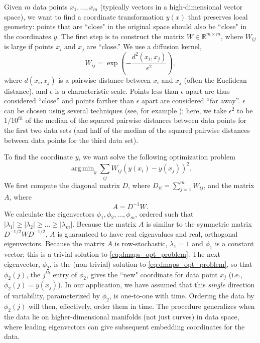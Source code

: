 \documentclass{pnastwo}
\DeclareMathOperator*{\argmin}{arg\,min}
\begin{document}
\begin{article}
Given $m$ data points $x_1, \dots, x_m$ (typically vectors in a high-dimensional vector space), we want to find a coordinate transformation $y(x)$ that preserves local geometry: points that are ``close" in the original space should also be ``close" in the coordinates $y$.
%
The first step is to construct the matrix $W \in \mathbb{R}^{m \times m}$, where $W_{ij}$ is large if points $x_i$ and $x_j$ are ``close.''
%
We use a diffusion kernel,
\begin{equation} \label{eq:dmaps_W}
W_{ij} = \exp \left( -\frac{d^2(x_i, x_j)}{\epsilon^2} \right),
\end{equation}
where $d(x_i, x_j)$ is a pairwise distance between $x_i$ and $x_j$ (often the Euclidean distance), and $\epsilon$ is a characteristic scale.
%
Points less than $\epsilon$ apart are thus considered ``close'' and points farther than $\epsilon$ apart are considered ``far away''.
%
$\epsilon$ can be chosen using several techniques (see, for example \cite{coifman2008graph, rohrdanz2011determination}); here, we take $\epsilon^2$ to be $1/10^{th}$ of the median of the squared pairwise distances between data points for the first two data sets (and half of the median of the squared pairwise distances between data points for the third data set).

To find the coordinate $y$, we want solve the following optimization problem \cite{Belkin2003}
\begin{equation} \label{eq:dmaps_opt_problem}
\argmin_{y} \sum_{ij} W_{ij} (y(x_i) - y(x_j))^2.
\end{equation}
%
We first compute the diagonal matrix $D$, where $D_{ii} = \sum_{j=1}^{m} W_{ij}$, and the matrix $A$, where
\begin{equation} \label{eq:dmaps_A}
A = D^{-1} W.
\end{equation}
%
We calculate the eigenvectors $\phi_1, \phi_2, \dots, \phi_m$, ordered such that $|\lambda_1| \ge |\lambda_2| \ge \dots \ge |\lambda_m|$.
%
Because the matrix $A$ is similar to the symmetric matrix $D^{-1/2} W D^{-1/2}$, $A$ is guaranteed to have real eigenvalues and real, orthogonal eigenvectors.
%
Because the matrix $A$ is row-stochastic, $\lambda_1=1$ and $\phi_1$ is a constant vector; this is a trivial solution to \eqref{eq:dmaps_opt_problem}.
%
%
The next eigenvector, $\phi_2$, is the (non-trivial) solution to \eqref{eq:dmaps_opt_problem}, so that $\phi_2(j)$, the $j^{th}$ entry of $\phi_2$, gives the ``new" coordinate for data point $x_j$ (i.e., $\phi_2(j) = y(x_j)$).
%
In our application, we have assumed that this {\em single} direction of variability, parameterized by $\phi_2$, is one-to-one with time.
%
Ordering the data by $\phi_2(j)$ will then, effectively, order them in time.
%
The procedure generalizes when the data lie on higher-dimensional manifolds (not just curves) in data space, where leading eigenvectors can give subsequent embedding coordinates for the data.
%


\end{article}
\end{document}
